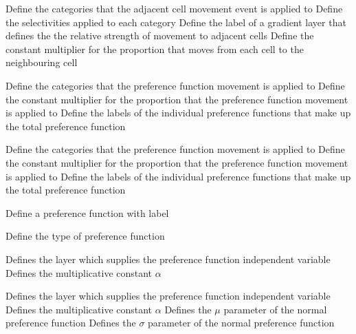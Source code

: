 \par\textbf{}\par
{} {Define the categories that the adjacent cell movement event is applied to}
 {Define the selectivities applied to each category}
 {Define the label of a gradient layer that defines the the relative strength of movement to adjacent cells}
 {Define the constant multiplier for the proportion that moves from each cell to the neighbouring cell}
\par\textbf{}\par
{} {Define the categories that the preference function movement is applied to}
 {Define the constant multiplier for the proportion that the preference function movement is applied to}
 {Define the labels of the individual  preference functions that make up the total preference function}
\par\textbf{}\par
{} {Define the categories that the preference function movement is applied to}
 {Define the constant multiplier for the proportion that the preference function movement is applied to}
 {Define the labels of the individual  preference functions that make up the total preference function}
\par{} {Define a preference function with label}\par
{} {Define the type of preference function}
\par\textbf{}\par
{} {Defines the layer which supplies the preference function independent variable}
 {Defines the multiplicative constant $\alpha$}
\par\textbf{}\par
{} {Defines the layer which supplies the preference function independent variable}
 {Defines the multiplicative constant $\alpha$}
 {Defines the $\mu$ parameter of the normal preference function}
 {Defines the $\sigma$ parameter of the normal preference function}
\par\textbf{}\par
